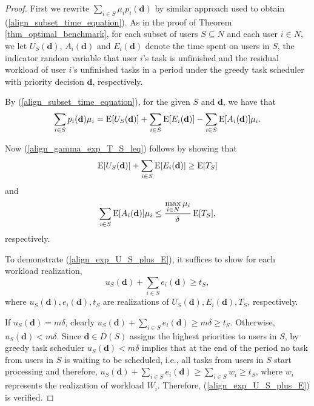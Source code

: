 \documentclass[prodmode,acmtompecs]{acmsmall}
\newcommand{\fullUserSet}{N}
\begin{document}
\begin{proof}
First we rewrite $\sum\limits_{i\in S} \mu_i p_i(\mathbf{d})$ by similar approach used to obtain (\ref{align_subset_time_equation}). 
As in the proof of Theorem \ref{thm_optimal_benchmark}, for each subset of users $S\subseteq \fullUserSet$ and each user $i \in \fullUserSet$, 
we let $U_S(\mathbf{d})$, $A_i(\mathbf{d})$ and $E_i(\mathbf{d})$ denote the time spent on users in $S$, the indicator random variable that user $i$'s task is unfinished and the residual workload of user $i$'s unfinished tasks in a period under the greedy task scheduler with priority decision $\mathbf{d}$, respectively. 


By (\ref{align_subset_time_equation}), for the given $S$ and $\mathbf{d}$, we have that
\begin{align*}
\sum\limits_{i\in S}p_i(\mathbf{d})\mu_i = \operatorname*{\mathrm{E}}[U_S(\mathbf{d})] + \sum\limits_{i\in S} \operatorname*{\mathrm{E}}[E_i(\mathbf{d})] - \sum\limits_{i\in S}\operatorname*{\mathrm{E}}[A_i(\mathbf{d})] \mu_i .
\end{align*}

Now (\ref{align_gamma_exp_T_S_leq}) follows by showing that
\begin{align}
\label{align_exp_U_S_plus_E}
\operatorname*{\mathrm{E}}[U_S(\mathbf{d})] + \sum\limits_{i\in S} \operatorname*{\mathrm{E}}[E_i(\mathbf{d})] \geq \operatorname*{\mathrm{E}}[T_S]
\end{align}
and 
\begin{align}
\label{align_wasted_smaller_than_fraction_of_total}
\sum\limits_{i\in S}\expectation[A_i(\mathbf{d})] \mu_i \leq \frac{\max\limits_{i \in \fullUserSet} \mu_i}{\delta} \expectation[T_S], 
\end{align}
respectively. 

To demonstrate (\ref{align_exp_U_S_plus_E}), it suffices to show for each workload realization, 
$$
u_S(\mathbf{d}) + \sum\limits_{i\in S}e_i(\mathbf{d}) \geq t_S, 
$$
where $u_S(\mathbf{d}), e_i(\mathbf{d}), t_S$ are realizations of $U_S(\mathbf{d}), E_i(\mathbf{d}), T_S$, respectively. 

If $u_S(\mathbf{d}) = m\delta$, clearly $u_S(\mathbf{d}) + \sum\limits_{i\in S}e_i(\mathbf{d}) \geq m\delta \geq t_S$. Otherwise, $u_S(\mathbf{d}) < m\delta$. Since $\mathbf{d} \in D(S)$ assigns the highest priorities to users in $S$, by greedy task scheduler $u_S(\mathbf{d}) < m\delta$ implies that at the end of the period no task from users in $S$ is waiting to be scheduled, i.e., all tasks from users in $S$ start processing and therefore, $u_S(\mathbf{d}) + \sum\limits_{i\in S}e_i(\mathbf{d}) \geq \sum\limits_{i\in S}w_i \geq t_S$, where $w_i$ represents the realization of workload $W_i$. Therefore, (\ref{align_exp_U_S_plus_E}) is verified. 


\end{proof}
\end{document}
